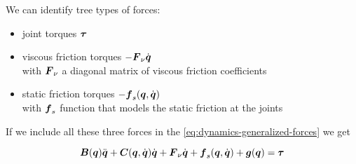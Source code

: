 We can identify tree types of forces:

\begin{itemize}
	\item joint torques $\boldsymbol{\tau}$
	\item viscous friction torques $-\boldsymbol{F}_\nu\dot{\boldsymbol{q}}$ \\
		with $\boldsymbol{F}_\nu$ a diagonal matrix of viscous friction coefficients
	\item static friction torques $-\boldsymbol{f}_s(\boldsymbol{q},\dot{\boldsymbol{q}})$ \\
		with $\boldsymbol{f}_s$ function that models the static friction at the joints
\end{itemize}

If we include all these three forces in the \autoref{eq:dynamics-generalized-forces} we get

\begin{equation}
	\boldsymbol{B}(\boldsymbol{q})\ddot{\boldsymbol{q}} + \boldsymbol{C}(\boldsymbol{q},\dot{\boldsymbol{q}})\dot{\boldsymbol{q}} + \boldsymbol{F}_\nu\dot{\boldsymbol{q}} + \boldsymbol{f}_s(\boldsymbol{q},\dot{\boldsymbol{q}}) + \boldsymbol{g}(\boldsymbol{q}) = \boldsymbol{\tau} \label{eq:dynamics}
\end{equation}